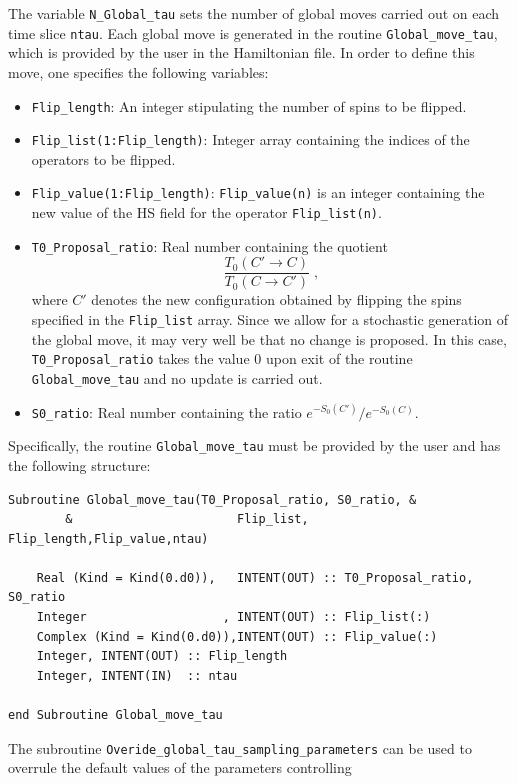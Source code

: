 The variable \texttt{N\_Global\_tau}  sets the number of global moves carried out on each time slice \texttt{ntau}. Each global move is generated in the routine  \texttt{Global\_move\_tau}, which is provided by the user in the Hamiltonian file. In order to  define this move, one specifies the following variables: 
\begin{itemize}
\item \texttt{Flip\_length}:  An integer stipulating the  number of spins to be flipped.
\item \texttt{Flip\_list(1:Flip\_length)}:   Integer array containing the  indices of the operators to be flipped.
\item \texttt{Flip\_value(1:Flip\_length)}:  \texttt{Flip\_value(n)} is an  integer containing the new value of the  HS  field for the operator \texttt{Flip\_list(n)}.
\item  \texttt{T0\_Proposal\_ratio}:   Real number containing  the quotient
\begin{equation}
	 \frac{T_0(C' \rightarrow C)}{T_0(C \rightarrow C') }  \;, \label{T0_ratio}
\end{equation}
where $ C'$  denotes the new configuration  obtained by flipping the spins specified in the \texttt{Flip\_list}  array. 
Since we allow for a stochastic  generation of  the global move, it may very well be that no change is proposed. In this case, \texttt{T0\_Proposal\_ratio}   takes the value 0 upon exit of the routine \texttt{Global\_move\_tau} and  no update is carried out. 
\item \texttt{S0\_ratio}:   Real number containing  the ratio  $e^{-S_0(C')}/e^{-S_0(C)}$. 
\end{itemize}
Specifically, the routine \texttt{Global\_move\_tau} must be provided by the user and has the following structure:
\begin{lstlisting}[style=fortran]
Subroutine Global_move_tau(T0_Proposal_ratio, S0_ratio, &
        &                       Flip_list, Flip_length,Flip_value,ntau)

    Real (Kind = Kind(0.d0)),   INTENT(OUT) :: T0_Proposal_ratio,  S0_ratio
    Integer                   , INTENT(OUT) :: Flip_list(:)
    Complex (Kind = Kind(0.d0)),INTENT(OUT) :: Flip_value(:)
    Integer, INTENT(OUT) :: Flip_length
    Integer, INTENT(IN)  :: ntau
             
end Subroutine Global_move_tau
\end{lstlisting}
The subroutine \texttt{Overide\_global\_tau\_sampling\_parameters} can be used to overrule the default values of the parameters controlling 
